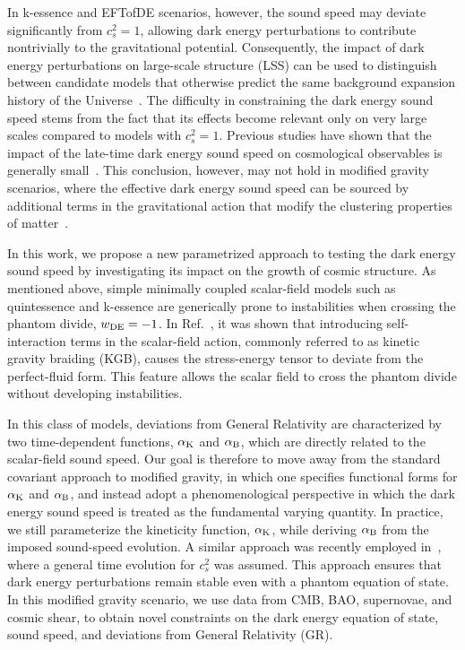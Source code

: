 \documentclass[%
reprint,
superscriptaddress,
preprint numbers,
nofootinbib,
amsmath,amssymb,
aps,
prd
]{revtex4-2}
\begin{document}
In k-essence and EFTofDE scenarios, however, the sound speed may deviate significantly from $c_s^2 = 1$, allowing dark energy perturbations to contribute nontrivially to the gravitational potential. Consequently, the impact of dark energy perturbations on large-scale structure (LSS) can be used to distinguish between candidate models that otherwise predict the same background expansion history of the Universe~\cite{kevolution, nefertiti, de_perturbations_simulations, growth_mg,Ballesteros:2010ks}. The difficulty in constraining the dark energy sound speed stems from the fact that its effects become relevant only on very large scales compared to models with $c_s^2 = 1$. Previous studies have shown that the impact of the late-time dark energy sound speed on cosmological observables is generally small~\cite{cs2_wmap_bean, cs2_cmb_forecasts, cs2_xia_2007, cs2_hannestad, cs2_huterer_linder}. This conclusion, however, may not hold in modified gravity scenarios, where the effective dark energy sound speed can be sourced by additional terms in the gravitational action that modify the clustering properties of matter~\cite{bellini_sawicky, mg_sims, kazuya_theoretical_priors_mg}.

In this work, we propose a new parametrized approach to testing the dark energy sound speed by investigating its impact on the growth of cosmic structure. As mentioned above, simple minimally coupled scalar-field models such as quintessence and k-essence are generically prone to instabilities when crossing the phantom divide, $w_{\rm DE}=-1$. In Ref.~\cite{Deffayet:2010qz}, it was shown that introducing self-interaction terms in the scalar-field action, commonly referred to as kinetic gravity braiding (KGB), causes the stress-energy tensor to deviate from the perfect-fluid form. This feature allows the scalar field to cross the phantom divide without developing instabilities. 

In this class of models, deviations from General Relativity are characterized by two time-dependent functions, $\alpha_{\rm K}$ and $\alpha_{\rm B}$, which are directly related to the scalar-field sound speed. Our goal is therefore to move away from the standard covariant approach to modified gravity, in which one specifies functional forms for $\alpha_{\rm K}$ and $\alpha_{\rm B}$, and instead adopt a phenomenological perspective in which the dark energy sound speed is treated as the fundamental varying quantity. In practice, we still parameterize the kineticity function, $\alpha_{\rm K}$, while deriving $\alpha_{\rm B}$ from the imposed sound-speed evolution. A similar approach was recently employed in~\cite{kazuya_mg_phantom}, where a general time evolution for $c_s^2$ was assumed. This approach ensures that dark energy perturbations remain stable even with a phantom equation of state. In this modified gravity scenario, we use data from CMB, BAO, supernovae, and cosmic shear, to obtain novel constraints on the dark energy equation of state, sound speed, and deviations from General Relativity (GR).
\end{document}
